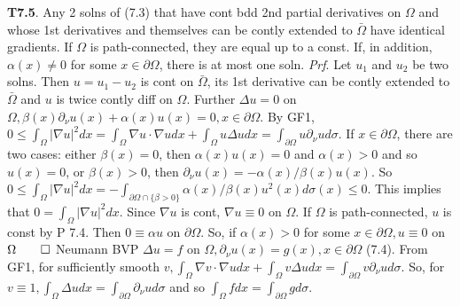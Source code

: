 {\bf T7.5}.  Any 2 solns of (7.3) that have cont bdd 2nd partial derivatives on $\Omega$ and whose 1st derivatives and themselves can be contly extended to $\bar{\Omega}$ have identical gradients. If $\Omega$ is path-connected, they are equal up to a const. If, in addition, $\alpha(x) \neq 0$ for some $x \in \partial \Omega$, there is at most one soln.  {\it Prf}. Let $u_1$ and $u_2$ be two solns.  Then $u = u_1 - u_2$ is cont on $\bar{\Omega}$, its 1st derivative can be contly extended to $\bar{\Omega}$ and $u$ is twice contly diff on $\Omega$.  Further $\Delta u = 0$ on $\Omega, \beta(x) \partial_{\nu} u(x) + \alpha(x) u(x) = 0, x \in \partial \Omega$. By GF1, $0 \leq \int_{\Omega} |\nabla u|^2 dx = \int_{\Omega} \nabla u \cdot \nabla u dx + \int_{\Omega} u \Delta u dx = \int_{\partial \Omega}u \partial_{\nu}u d \sigma$. If $x \in \partial \Omega$, there are two cases:  either $\beta(x) = 0$, then $\alpha(x) u(x) = 0$ and $\alpha(x) > 0$ and so $u(x) = 0$, or $\beta (x) > 0$, then $\partial_{\nu} u(x) = - \alpha(x)/\beta(x) u(x)$. So $0 \leq \int_{\Omega} | \nabla u|^2 dx = - \int_{\partial \Omega \cap \{\beta > 0 \}} \alpha(x)/\beta(x) u^2(x)d \sigma(x) \leq 0$. This implies that $0 = \int_{\Omega}|\nabla u|^2 dx$. Since $\nabla u$ is cont, $\nabla u \equiv 0$ on $\Omega$. If $\Omega$ is path-connected, $u$ is const by P 7.4. Then $0 \equiv \alpha u$ on $\partial \Omega$. So, if $\alpha(x) > 0$ for some $x \in \partial \Omega, u \equiv 0$ on $\Omega \qed$  Neumann BVP $\Delta u = f$ on $\Omega, \partial_{\nu} u(x) = g(x), x \in \partial \Omega$ (7.4). From GF1, for sufficiently smooth $v, \int_{\Omega} \nabla v \cdot \nabla u dx + \int_{\Omega} v \Delta u dx = \int_{\partial \Omega}v \partial_{\nu} u d \sigma$. So, for $v \equiv 1, \int_{\Omega} \Delta u dx = \int_{\partial \Omega} \partial_{\nu} u d \sigma$ and so $\int_{\Omega} f dx = \int_{\partial \Omega}  g d \sigma$. 